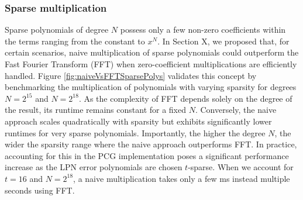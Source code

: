 \subsubsection{Sparse multiplication}
Sparse polynomials of degree $N$ possess only a few non-zero coefficients within the terms ranging from the constant to $x^N$. In Section X, we proposed that, for certain scenarios, naive multiplication of sparse polynomials could outperform the Fast Fourier Transform (FFT) when zero-coefficient multiplications are efficiently handled. Figure \ref{fig:naiveVsFFTSparsePolys} validates this concept by benchmarking the multiplication of polynomials with varying sparsity for degrees $N=2^{15}$ and $N=2^{18}$. As the complexity of FFT depends solely on the degree of the result, its runtime remains constant for a fixed $N$.  Conversely, the naive approach scales quadratically with sparsity but exhibits significantly lower runtimes for very sparse polynomials. Importantly, the higher the degree $N$, the wider the sparsity range where the naive approach outperforms FFT. In practice, accounting for this in the PCG implementation poses a significant performance increase as the LPN error polynomials are chosen $t$-sparse. When we account for $t=16$ and $N=2^{18}$, a naive multiplication takes only a few ms instead multiple seconds using FFT.

